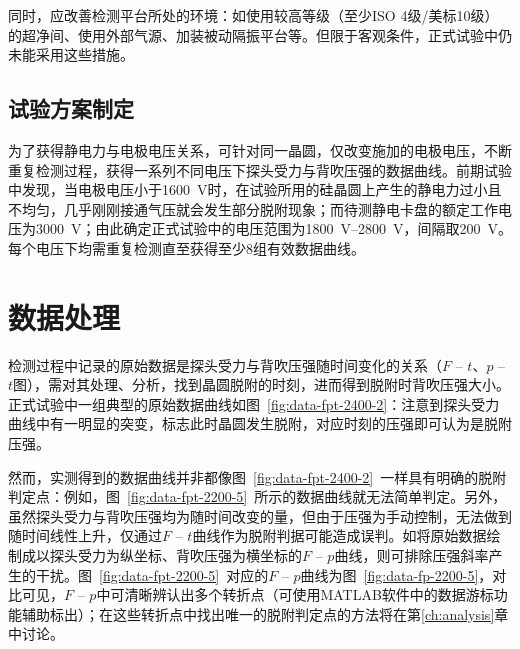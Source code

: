 同时，应改善检测平台所处的环境：如使用较高等级（至少ISO 4级/美标10级）的超净间、使用外部气源、加装被动隔振平台等。但限于客观条件，正式试验中仍未能采用这些措施。


\subsection{试验方案制定}\label{sec:exp-main-plan}

为了获得静电力与电极电压关系，可针对同一晶圆，仅改变施加的电极电压，不断重复检测过程，获得一系列不同电压下探头受力与背吹压强的数据曲线。前期试验中发现，当电极电压小于\SI{1600}{\V}时，在试验所用的硅晶圆上产生的静电力过小且不均匀，几乎刚刚接通气压就会发生部分脱附现象；而待测静电卡盘的额定工作电压为\SI{3000}{\V}；由此确定正式试验中的电压范围为\SIrange{1800}{2800}{\V}，间隔取\SI{200}{\V}。每个电压下均需重复检测直至获得至少8组有效数据曲线。



\section{数据处理}\label{sec:exp-data}

检测过程中记录的原始数据是探头受力与背吹压强随时间变化的关系（$F$ -- $t$、$p$ -- $t$图），需对其处理、分析，找到晶圆脱附的时刻，进而得到脱附时背吹压强大小。正式试验中一组典型的原始数据曲线如图~\ref{fig:data-fpt-2400-2}：注意到探头受力曲线中有一明显的突变，标志此时晶圆发生脱附，对应时刻的压强即可认为是脱附压强。

然而，实测得到的数据曲线并非都像图~\ref{fig:data-fpt-2400-2}~一样具有明确的脱附判定点：例如，图~\ref{fig:data-fpt-2200-5}~所示的数据曲线就无法简单判定。另外，虽然探头受力与背吹压强均为随时间改变的量，但由于压强为手动控制，无法做到随时间线性上升，仅通过$F$ -- $t$曲线作为脱附判据可能造成误判。如将原始数据绘制成以探头受力为纵坐标、背吹压强为横坐标的$F$ -- $p$曲线，则可排除压强斜率产生的干扰。图~\ref{fig:data-fpt-2200-5}~对应的$F$ -- $p$曲线为图~\ref{fig:data-fp-2200-5}，对比可见，$F$ -- $p$中可清晰辨认出多个转折点（可使用MATLAB软件中的数据游标功能辅助标出）；在这些转折点中找出唯一的脱附判定点的方法将在第\ref{ch:analysis}章中讨论。



